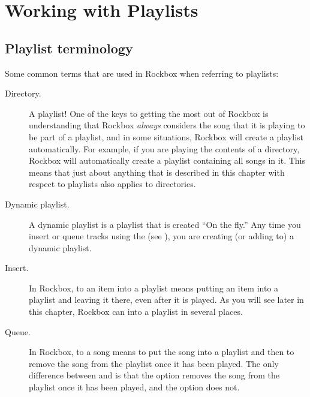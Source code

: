 \section{\label{ref:working_with_playlists}Working with Playlists}

\subsection{Playlist terminology}
Some common terms that are used in Rockbox when referring to
playlists:

\begin{description}
\item[Directory.] A playlist! One of the keys to getting the most out of
  Rockbox is understanding that Rockbox \emph{always} considers the song that
  it is playing to be part of a playlist, and in some situations, Rockbox will
  create a playlist automatically. For example, if you are playing the
  contents of a directory, Rockbox will automatically create a playlist
  containing all songs in it. This means that just about anything
  that is described in this chapter with respect to playlists also applies to
  directories.

\item[Dynamic playlist.]  A dynamic playlist is a playlist that is created
  ``On the fly.'' Any time you insert or queue tracks using the
   (see ), you are
  creating (or adding to) a dynamic playlist.

\item[Insert.] In Rockbox, to  an item into a playlist means
  putting an item into a playlist and leaving it there, even after it is
  played. As you will see later in this chapter, Rockbox can 
  into a playlist in several places.

\item[Queue.] In Rockbox, to  a song means to put the song
  into a playlist and then to remove the song from the playlist once it has
  been played. The only difference between  and
   is that the  option removes the song from the
  playlist once it has been played, and the  option does not.
\end{description}

